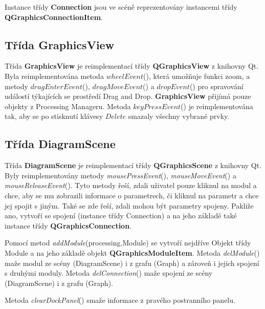 Instance třídy \textbf{Connection} jsou ve scéně reprezentovány instancemi třídy \textbf{QGraphicsConnectionItem}.

\subsection*{Třída GraphicsView}
Třída \textbf{GraphicsView} je reimplementací třídy \textbf{QGraphicsView} z knihovny Qt. Byla reimplementována metoda $wheelEvent$(), která umožňuje funkci zoom, a  metody $dragEnterEvent$(), $dragMoveEvent$() a $dropEvent$() pro spravování událostí týkajících se prostředí Drag and Drop. \textbf{GraphicsView} přijímá pouze objekty z Processing Manageru. Metoda $keyPressEvent$() je reimplementována tak, aby se po stisknutí klávesy $Delete$ smazaly všechny vybrané prvky. 


\subsection*{Třída DiagramScene}
Třída \textbf{DiagramScene} je reimplementací třídy \textbf{QGraphicsScene} z knihovny Qt. Byly reimplementovány metody \textit{mousePressEvent}(), \textit{mouseMoveEvent}() a \textit{mouseReleaseEvent}(). Tyto metody řeší, zdali uživatel pouze kliknul na modul a chce, aby se mu zobrazili informace o parametrech, či kliknul na parametr a chce jej spojit s jiným. Také se zde řeší, zdali mohou být parametry spojeny. Pakliže ano, vytvoří se spojení (instance třídy Connection) a na jeho základě také instance třídy \textbf{QGraphicsConnection}.

Pomocí metod \textit{addModule}(processing.Module) se vytvoří nejdříve Objekt třídy Module a na jeho základě objekt \textbf{QGraphicsModuleItem}. Metoda \textit{delModule}() maže modul ze scény (DiagramScene) i z grafu (Graph) a zároveň i jejich spojení s druhými moduly. Metoda \textit{delConnection}() maže spojení ze scény (DiagramScene) i z grafu (Graph).

Metoda \textit{clearDockPanel}() smaže informace z pravého postranního panelu.